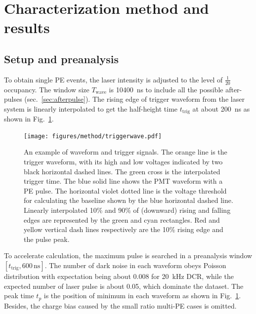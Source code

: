 \section{Characterization method and results}
\label{Method}
\subsection{Setup and preanalysis}
\label{sec:laserstage}

To obtain single PE events, the laser intensity is adjusted to the level of $\frac{1}{20}$ occupancy. The window size $T_{\mathrm{wave}}$ is \SI{10400}{ns} to include all the possible after-pulses (sec.~\ref{sec:afterpulse}). The rising edge of trigger waveform from the laser system is linearly interpolated to get the half-height time $t_{\mathrm{trig}}$ at about \SI{200}{ns} as shown in Fig.~\ref{fig:triggertime}.
\begin{figure}[!htbp]
    \centering
    \texttt{[image: figures/method/triggerwave.pdf]}
    \caption{An example of waveform and trigger signals. The orange line is the trigger waveform, with its high and low voltages indicated by two black horizontal dashed lines. The green cross is the interpolated trigger time. The blue solid line shows the PMT waveform with a PE pulse. The horizontal violet dotted line is the voltage threshold for calculating the baseline shown by the blue horizontal dashed line. Linearly interpolated 10\% and 90\% of (downward) rising and falling edges are represented by the green and cyan rectangles. Red and yellow vertical dash lines respectively are the 10\% rising edge and the pulse peak.}
    \label{fig:triggertime}
\end{figure}

To accelerate calculation, the maximum pulse is searched in a preanalysis window $[t_{\mathrm{trig}},600\,\mathrm{ns}]$. The number of dark noise in each waveform obeys Poisson distribution with expectation being about 0.008 for \SI{20}{kHz} DCR, while the expected number of laser pulse is about 0.05, which dominate the dataset. The peak time $t_p$ is the position of minimum in each waveform as shown in Fig.~\ref{fig:triggertime}.
Besides, the charge bias caused by the small ratio multi-PE cases is omitted.

